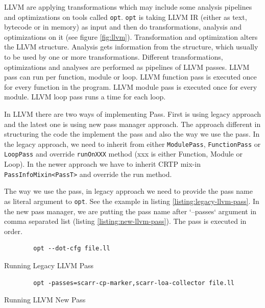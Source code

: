 LLVM are applying transformations \textemdash{} which may include some analysis
pipelines \textemdash{} and optimizations on tools called \texttt{opt}.
\texttt{opt} is taking LLVM IR (either as text, bytecode or in memory) as input
and then do transformations, analysis and optimizations on it (see figure
\ref{fig:llvm}). Transformation and optimization alters the LLVM structure.
Analysis gets information from the structure, which usually to be used by one or
more transformations. Different transformations, optimizations and analyses are
performed as pipelines of LLVM passes. LLVM pass can run per function, module or
loop. LLVM function pass is executed once for every function in the program.
LLVM module pass is executed once for every module. LLVM loop pass runs a time
for each loop.  


In LLVM there are two ways of implementing Pass. First is using legacy approach
and the latest one is using new pass manager approach. The approach different in
structuring the code the implement the pass and also the way we use the pass.
In the legacy approach, we need to inherit from either \texttt{ModulePass},
\texttt{FunctionPass} or \texttt{LoopPass} and override \texttt{runOnXXX} method
(xxx is either Function, Module or Loop). In the newer approach we have to
inherit CRTP mix-in \texttt{PassInfoMixin<PassT>} and override the run method.

The way we use the pass, in legacy approach we need to provide the pass name as
literal argument to \texttt{opt}. See the example in listing
\ref{listing:legacy-llvm-pass}. In the new pass manager, we are putting the pass
name after `--passes` argument in comma separated list (listing
\ref{listing:new-llvm-pass}). The pass is executed in order.

\begin{listing}[htbp]
    \begin{verbatim}
        opt --dot-cfg file.ll 
    \end{verbatim}
    \caption{Running Legacy LLVM Pass}    
    \label{listing:legacy-llvm-pass}
\end{listing}

\begin{listing}[htpb]
    \begin{verbatim}
        opt -passes=scarr-cp-marker,scarr-loa-collector file.ll 
    \end{verbatim}
\caption{Running LLVM New Pass}    
\label{listing:new-llvm-pass}
\end{listing}

